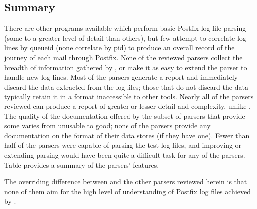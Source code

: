\subsection{Summary}

There are other programs available which perform basic Postfix log file
parsing (some to a greater level of detail than others), but few attempt to
correlate log lines by queueid (none correlate by \gls{pid}) to produce an
overall record of the journey of each mail through Postfix.  None of the
reviewed parsers collect the breadth of information gathered by
\parsername{}, or make it as easy to extend the parser to handle new log
lines.  Most of the parsers generate a report and immediately discard the
data extracted from the log files; those that do not discard the data
typically retain it in a format inaccessible to other tools.  Nearly all of
the parsers reviewed can produce a report of greater or lesser detail and
complexity, unlike \parsername{}.  The quality of the documentation offered
by the subset of parsers that provide some varies from unusable to good;
none of the parsers provide any documentation on the format of their data
stores (if they have one).  Fewer than half of the parsers were capable of
parsing the \numberOFlogFILES{} test log files, and improving or extending
parsing would have been quite a difficult task for any of the parsers.
Table  provides a summary of the
parsers' features.

The overriding difference between \parsername{} and the other parsers
reviewed herein is that none of them aim for the high level of
understanding of Postfix log files achieved by \parsername{}.


